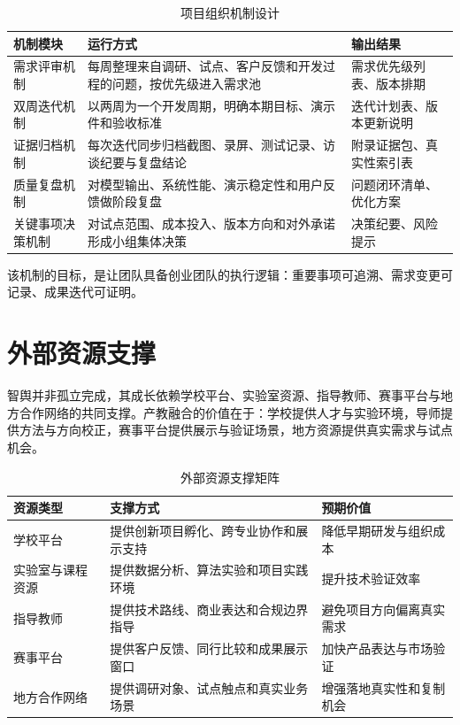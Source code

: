 \begin{table}[htbp]
	\centering
	\caption{项目组织机制设计}
	\begin{tabularx}{\textwidth}{L{3cm}Y L{3cm}}
		\toprule
		机制模块     & 运行方式                               & 输出结果         \\
		\midrule
		需求评审机制   & 每周整理来自调研、试点、客户反馈和开发过程的问题，按优先级进入需求池 & 需求优先级列表、版本排期 \\
		双周迭代机制   & 以两周为一个开发周期，明确本期目标、演示件和验收标准         & 迭代计划表、版本更新说明 \\
		证据归档机制   & 每次迭代同步归档截图、录屏、测试记录、访谈纪要与复盘结论       & 附录证据包、真实性索引表 \\
		质量复盘机制   & 对模型输出、系统性能、演示稳定性和用户反馈做阶段复盘         & 问题闭环清单、优化方案  \\
		关键事项决策机制 & 对试点范围、成本投入、版本方向和对外承诺形成小组集体决策       & 决策纪要、风险提示    \\
		\bottomrule
	\end{tabularx}
\end{table}

该机制的目标，是让团队具备创业团队的执行逻辑：重要事项可追溯、需求变更可记录、成果迭代可证明。

\section{外部资源支撑}

智舆并非孤立完成，其成长依赖学校平台、实验室资源、指导教师、赛事平台与地方合作网络的共同支撑。产教融合的价值在于：学校提供人才与实验环境，导师提供方法与方向校正，赛事平台提供展示与验证场景，地方资源提供真实需求与试点机会。

\begin{table}[htbp]
	\centering
	\caption{外部资源支撑矩阵}
	\begin{tabularx}{\textwidth}{L{3cm}Y L{3cm}}
		\toprule
		资源类型     & 支撑方式                & 预期价值         \\
		\midrule
		学校平台     & 提供创新项目孵化、跨专业协作和展示支持 & 降低早期研发与组织成本  \\
		实验室与课程资源 & 提供数据分析、算法实验和项目实践环境  & 提升技术验证效率     \\
		指导教师     & 提供技术路线、商业表达和合规边界指导  & 避免项目方向偏离真实需求 \\
		赛事平台     & 提供客户反馈、同行比较和成果展示窗口  & 加快产品表达与市场验证  \\
		地方合作网络   & 提供调研对象、试点触点和真实业务场景  & 增强落地真实性和复制机会 \\
		\bottomrule
	\end{tabularx}
\end{table}


